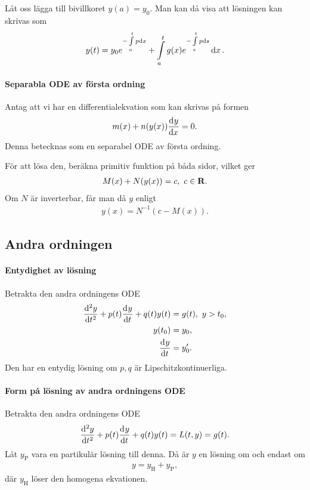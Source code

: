 Låt oss lägga till bivillkoret $y(a) = y_0$. Man kan då visa att lösningen kan skrivas som
\begin{align*}
	y(t) = y_0e^{-\int\limits_{a}^{t}p\dd{x}} + \int\limits_{a}^{t}g(x)e^{-\int\limits_{x}^{t}p\dd{s}}\dd{x}.
\end{align*}

\paragraph{Separabla ODE av första ordning}
Antag att vi har en differentialekvation som kan skrivas på formen
\begin{align*}
	m(x) + n(y(x))\dv[]{y}{x} (x) = 0.
\end{align*}
Denna betecknas som en separabel ODE av första ordning.

För att lösa den, beräkna primitiv funktion på båda sidor, vilket ger
\begin{align*}
	M(x) + N(y(x)) = c,\ c\in\mathbf{R}.
\end{align*}
Om $N$ är inverterbar, får man då $y$ enligt
\begin{align*}
	y(x) = N^{-1}(c - M(x)).
\end{align*}

\subsection{Andra ordningen}

\paragraph{Entydighet av lösning}
Betrakta den andra ordningens ODE
\begin{align*}
	\dv[2]{y}{t} (t) + p(t)\dv[]{y}{t} (t) + q(t)y(t) &= g(t),\ y > t_0, \\
	y(t_0)                                              &= y_0, \\
	\dv[]{y}{t} (t_{0})                                 &= y'_{0}.
\end{align*}
Den har en entydig lösning om $p, q$ är Lipschitzkontinuerliga.

\paragraph{Form på lösning av andra ordningens ODE}
Betrakta den andra ordningens ODE
\begin{align*}
	\dv[2]{y}{t} (t) + p(t)\dv[]{y}{t} (t) + q(t)y(t) = L(t, y) = g(t).
\end{align*}
Låt $y_{\text{P}}$ vara en partikulär lösning till denna. Då är $y$ en lösning om och endast om
\begin{align*}
	y = y_{\text{H}} + y_{\text{P}},
\end{align*}
där $y_{\text{H}}$ löser den homogena ekvationen.

